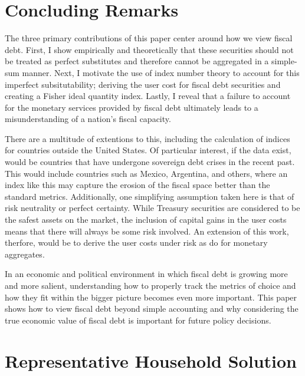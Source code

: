 \documentclass[11pt,a4paper,margin=1.5in]{article}
\begin{document}
\section{Concluding Remarks}
The three primary contributions of this paper center around how we view fiscal debt.
First, I show empirically and theoretically that these securities should not be treated as perfect substitutes and therefore cannot be aggregated in a simple-sum manner. 
Next, I motivate the use of index number theory to account for this imperfect subsitutability; deriving the user cost for fiscal debt securities and creating a Fisher ideal quantity index.
Lastly, I reveal that a failure to account for the monetary services provided by fiscal debt ultimately leads to a misunderstanding of a nation's fiscal capacity. 

There are a multitude of extentions to this, including the calculation of indices for countries outside the United States.
Of particular interest, if the data exist, would be countries that have undergone sovereign debt crises in the recent past.
This would include countries such as Mexico, Argentina, and others, where an index like this may capture the erosion of the fiscal space better than the standard metrics.
Additionally, one simplifying assumption taken here is that of risk neutrality or perfect certainty.
While Treasury securities are considered to be the safest assets on the market, the inclusion of capital gains in the user costs means that there will always be some risk involved.
An extension of this work, therfore, would be to derive the user costs under risk as \citet{Barnett-Liu-Jensen:1997} do for monetary aggregates.

In an economic and political environment in which fiscal debt is growing more and more salient, understanding how to properly track the metrics of choice and how they fit within the bigger picture becomes even more important.
This paper shows how to view fiscal debt beyond simple accounting and why considering the true economic value of fiscal debt is important for future policy decisions. 
\newpage




\newpage
\appendix
{}
\section{Representative Household Solution}
\label{app:HH_Solution}
\end{document}

